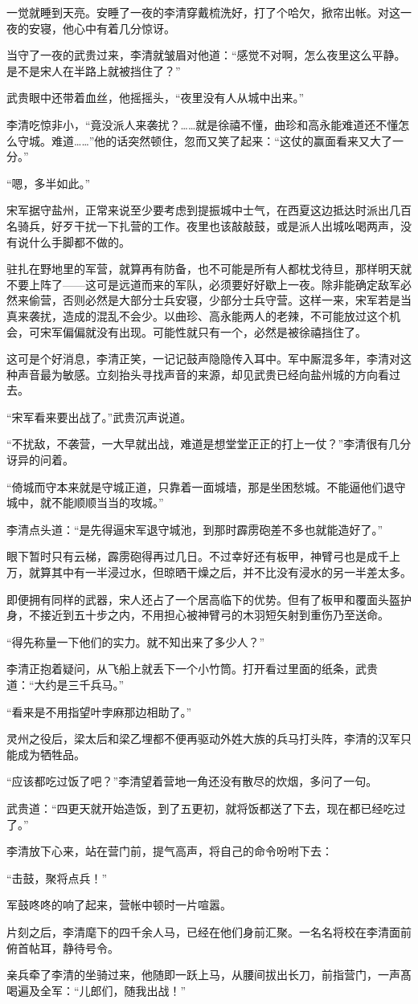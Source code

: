 一觉就睡到天亮。安睡了一夜的李清穿戴梳洗好，打了个哈欠，掀帘出帐。对这一夜的安寝，他心中有着几分惊讶。

当守了一夜的武贵过来，李清就皱眉对他道：“感觉不对啊，怎么夜里这么平静。是不是宋人在半路上就被挡住了？”

武贵眼中还带着血丝，他摇摇头，“夜里没有人从城中出来。”

李清吃惊非小，“竟没派人来袭扰？……就是徐禧不懂，曲珍和高永能难道还不懂怎么守城。难道……”他的话突然顿住，忽而又笑了起来：“这仗的赢面看来又大了一分。”

“嗯，多半如此。”

宋军据守盐州，正常来说至少要考虑到提振城中士气，在西夏这边抵达时派出几百名骑兵，好歹干扰一下扎营的工作。夜里也该敲敲鼓，或是派人出城吆喝两声，没有说什么手脚都不做的。

驻扎在野地里的军营，就算再有防备，也不可能是所有人都枕戈待旦，那样明天就不要上阵了——这可是远道而来的军队，必须要好好歇上一夜。除非能确定敌军必然来偷营，否则必然是大部分士兵安寝，少部分士兵守营。这样一来，宋军若是当真来袭扰，造成的混乱不会少。以曲珍、高永能两人的老辣，不可能放过这个机会，可宋军偏偏就没有出现。可能性就只有一个，必然是被徐禧挡住了。

这可是个好消息，李清正笑，一记记鼓声隐隐传入耳中。军中厮混多年，李清对这种声音最为敏感。立刻抬头寻找声音的来源，却见武贵已经向盐州城的方向看过去。

“宋军看来要出战了。”武贵沉声说道。

“不扰敌，不袭营，一大早就出战，难道是想堂堂正正的打上一仗？”李清很有几分讶异的问着。

“倚城而守本来就是守城正道，只靠着一面城墙，那是坐困愁城。不能逼他们退守城中，就不能顺顺当当的攻城。”

李清点头道：“是先得逼宋军退守城池，到那时霹雳砲差不多也就能造好了。”

眼下暂时只有云梯，霹雳砲得再过几日。不过幸好还有板甲，神臂弓也是成千上万，就算其中有一半浸过水，但晾晒干燥之后，并不比没有浸水的另一半差太多。

即便拥有同样的武器，宋人还占了一个居高临下的优势。但有了板甲和覆面头盔护身，不接近到五十步之内，不用担心被神臂弓的木羽短矢射到重伤乃至送命。

“得先称量一下他们的实力。就不知出来了多少人？”

李清正抱着疑问，从飞船上就丢下一个小竹筒。打开看过里面的纸条，武贵道：“大约是三千兵马。”

“看来是不用指望叶孛麻那边相助了。”

灵州之役后，梁太后和梁乙埋都不便再驱动外姓大族的兵马打头阵，李清的汉军只能成为牺牲品。

“应该都吃过饭了吧？”李清望着营地一角还没有散尽的炊烟，多问了一句。

武贵道：“四更天就开始造饭，到了五更初，就将饭都送了下去，现在都已经吃过了。”

李清放下心来，站在营门前，提气高声，将自己的命令吩咐下去：

“击鼓，聚将点兵！”

军鼓咚咚的响了起来，营帐中顿时一片喧嚣。

片刻之后，李清麾下的四千余人马，已经在他们身前汇聚。一名名将校在李清面前俯首帖耳，静待号令。

亲兵牵了李清的坐骑过来，他随即一跃上马，从腰间拔出长刀，前指营门，一声髙喝遍及全军：“儿郎们，随我出战！”

